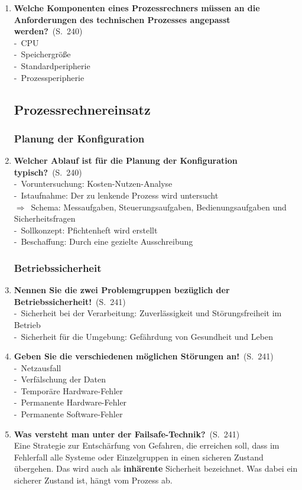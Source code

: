 \documentclass[a4paper,12pt]{article}
\newcommand{\question}[3]{\pagebreak[3]\item {\textbf{#1?}}\ (S.\ #2)#3}
\newcommand{\statement}[3]{\pagebreak[3]\item {\textbf{#1!}}\ (S.\ #2)#3}
\newcommand{\catchword}[1]{\\-\ #1}
\newcommand{\normaltext}[1]{\\#1}
\newcommand{\result}[1]{\\$\Rightarrow$\ #1}
\newcommand{\page}[1]{#1}
\newcommand{\important}[1]{\textbf{#1}}
\begin{document}
\begin{enumerate}
  \question{Welche Komponenten eines Prozessrechners müssen an die Anforderungen
            des technischen Prozesses angepasst werden}{\page{240}}
  {
    \catchword{CPU}
    \catchword{Speichergröße}
    \catchword{Standardperipherie}
    \catchword{Prozessperipherie}
  }

  \subsection{Prozessrechnereinsatz}

  \subsubsection{Planung der Konfiguration}

  \question{Welcher Ablauf ist für die Planung der Konfiguration typisch}{\page{240}}
  {
    \catchword{Voruntersuchung: Kosten-Nutzen-Analyse}
    \catchword{Istaufnahme: Der zu lenkende Prozess wird untersucht}
    \result{Schema: Messaufgaben, Steuerungsaufgaben, Bedienungsaufgaben und Sicherheitsfragen}
    \catchword{Sollkonzept: Pfichtenheft wird erstellt}
    \catchword{Beschaffung: Durch eine gezielte Ausschreibung}
  }

  \subsubsection{Betriebssicherheit}

  \statement{Nennen Sie die zwei Problemgruppen bezüglich der Betriebssicherheit}{\page{241}}
  {
    \catchword{Sicherheit bei der Verarbeitung: Zuverlässigkeit und Störungsfreiheit im Betrieb}
    \catchword{Sicherheit für die Umgebung: Gefährdung von Gesundheit und Leben}
  }

  \statement{Geben Sie die verschiedenen möglichen Störungen an}{\page{241}}
  {
    \catchword{Netzausfall}
    \catchword{Verfälschung der Daten}
    \catchword{Temporäre Hardware-Fehler}
    \catchword{Permanente Hardware-Fehler}
    \catchword{Permanente Software-Fehler}
  }

  \question{Was versteht man unter der Failsafe-Technik}{\page{241}}
  {
    \normaltext{Eine Strategie zur Entschärfung von Gefahren, die erreichen soll,
                dass im Fehlerfall alle Systeme oder Einzelgruppen in einen sicheren
                Zustand übergehen. Das wird auch als \important{inhärente} Sicherheit
                bezeichnet. Was dabei ein sicherer Zustand ist, hängt vom Prozess ab.}
  }


\end{enumerate}
\end{document}
